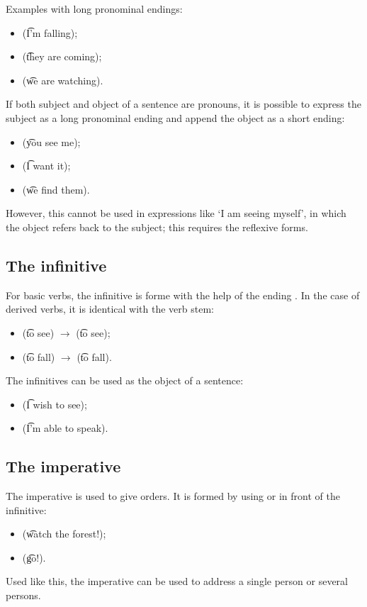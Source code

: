 Examples with long pronominal endings:
\begin{itemize}
  \item {} (\t{I'm falling});
  \item {} (\t{they are coming});
  \item {} (\t{we are watching}).
\end{itemize}
If both subject and object of a sentence are pronouns, it is possible to express
the subject as a long pronominal ending and append the object as a short ending:
\begin{itemize}
  \item {} (\t{you see me});
  \item {} (\t{I want it});
  \item {} (\t{we find them}).
\end{itemize}
However, this cannot be used in expressions like `I am seeing myself', in which
the object refers back to the subject; this requires the reflexive forms.

\subsection{The infinitive}
For basic verbs, the infinitive is forme with the help of the ending . In
the case of derived verbs, it is identical with the verb stem:
\begin{itemize}
  \item {} (\t{to see}) $\rightarrow$  (\t{to see});
  \item {} (\t{to fall}) $\rightarrow$  (\t{to fall}).
\end{itemize}
The infinitives can be used as the object of a sentence:
\begin{itemize}
  \item {} (\t{I wish to see});
  \item {} (\t{I'm able to speak}).
\end{itemize}

\subsection{The imperative}
The imperative is used to give orders. It is formed by using  or  in
front of the infinitive:
\begin{itemize}
  \item {} (\t{watch the forest!});
  \item {} (\t{go!}).
\end{itemize}
Used like this, the imperative can be used to address a single person or several
persons.

